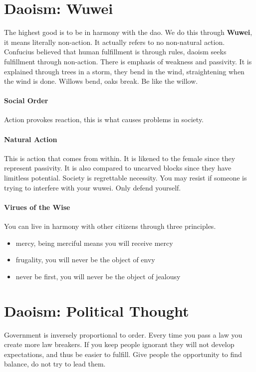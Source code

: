 \documentclass{article}
\begin{document}
\section*{Daoism: Wuwei}
\label{sec:daoism_wuwei}
The highest good is to be in harmony with the dao. We do this through \textbf{Wuwei}, it means literally non-action. It actually refers to no non-natural action. Confucius believed that human fulfillment is through rules, daoism seeks fulfillment through non-action. There is emphasis of weakness and passivity. It is explained through trees in a storm, they bend in the wind, straightening when the wind is done. Willows bend, oaks break. Be like the willow.

\paragraph{Social Order}
\label{par:social_order}
Action provokes reaction, this is what causes problems in society.

\paragraph{Natural Action}
\label{par:natural_action}
This is action that comes from within. It is likened to the female since they represent passivity. It is also compared to uncarved blocks since they have limitless potential. Society is regrettable necessity. You may resist if someone is trying to interfere with your wuwei. Only defend yourself.

\paragraph{Virues of the Wise}
\label{par:virues_of_the_wise}
You can live in harmony with other citizens through three principles.
\begin{itemize}
	\item mercy, being merciful means you will receive mercy
	\item frugality, you will never be the object of envy
	\item never be first, you will never be the object of jealousy
\end{itemize}

\section*{Daoism: Political Thought}
\label{sec:daoism_political_thought}
Government is inversely proportional to order. Every time you pass a law you create more law breakers. If you keep people ignorant they will not develop expectations, and thus be easier to fulfill. Give people the opportunity to find balance, do not try to lead them.
\end{document}
